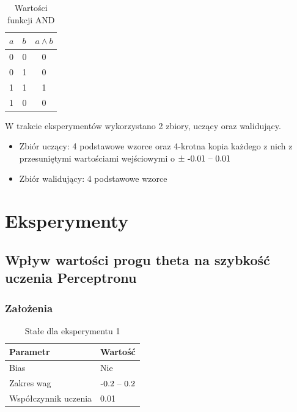 \documentclass{article}
\begin{document}
\begin{table}[!h]
	\caption{Wartości funkcji AND}
	\label{tabela-and}
	\centering
	\begin{tabular}{llc}
		\toprule
		\(a\) & \(b\) & \(a \land b\) \\
		\midrule
		0     & 0     & 0             \\
		0     & 1     & 0             \\
		1     & 1     & 1             \\
		1     & 0     & 0             \\
		\bottomrule
	\end{tabular}
\end{table}

W trakcie eksperymentów wykorzystano 2 zbiory, uczący oraz walidujący.
\begin{itemize}
	\item Zbiór uczący: 4 podstawowe wzorce oraz 4-krotna kopia każdego z nich z przesuniętymi wartościami wejściowymi o \(\pm\ $-0.01 -- 0.01$\)
	\item Zbiór walidujący: 4 podstawowe wzorce
\end{itemize}

\newpage
\section{Eksperymenty}

\subsection{Wpływ wartości progu theta na szybkość uczenia Perceptronu}
\subsubsection*{Założenia}
\begin{table}[!h]
	\caption{Stałe dla eksperymentu 1}
	\label{tabela-const-1}
	\centering
	\begin{tabular}{ll}
		\toprule
		Parametr               & Wartość         \\
		\midrule
		Bias                   & Nie               \\
		Zakres wag             & \($-0.2 -- 0.2$\) \\
		Współczynnik uczenia & 0.01              \\
		\bottomrule
	\end{tabular}
\end{table}
\end{document}

